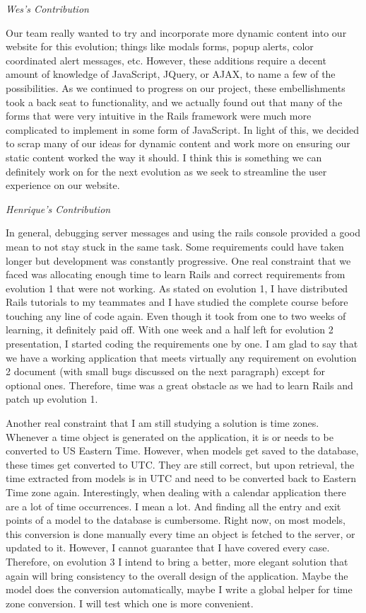 \documentclass[11pt]{article}
\begin{document}
\textit{Wes's Contribution}

Our team really wanted to try and incorporate more dynamic content into our website for this evolution; things like modals forms, popup alerts, color coordinated alert messages, etc.  However, these additions require a decent amount of knowledge of JavaScript, JQuery, or AJAX, to name a few of the possibilities.  As we continued to progress on our project, these embellishments took a back seat to functionality, and we actually found out that many of the forms that were very intuitive in the Rails framework were much more complicated to implement in some form of JavaScript.  In light of this, we decided to scrap many of our ideas for dynamic content and work more on ensuring our static content worked the way it should.  I think this is something we can definitely work on for the next evolution as we seek to streamline the user experience on our website. 

\textit{Henrique's Contribution}

In general, debugging server messages and using the rails console provided a good mean to not stay stuck in the same task. Some requirements could have taken longer but development was constantly progressive. One real constraint that we faced was allocating enough time to learn Rails and correct requirements from evolution 1 that were not working. As stated on evolution 1, I have distributed Rails tutorials to my teammates and I have studied the complete course before touching any line of code again. Even though it took from one to two weeks of learning, it definitely paid off. With one week and a half left for evolution 2 presentation, I started coding the requirements one by one. I am glad to say  that we have a working application that meets virtually any requirement on evolution 2 document (with small bugs discussed on the next paragraph) except for optional ones. Therefore, time was a great obstacle as we had to learn Rails and patch up evolution 1.

Another real constraint that I am still studying a solution is time zones. Whenever a time object is generated on the application, it is or needs to be converted to US Eastern Time. However, when models get saved to the database, these times get converted to UTC. They are still correct, but upon retrieval, the time extracted from models is in UTC and need to be converted back to Eastern Time zone again. Interestingly, when dealing with a calendar application there are a lot of time occurrences. I mean a lot. And finding all the entry and exit points of a model to the database is cumbersome. Right now, on most models, this conversion is done manually every time an object is fetched to the server, or updated to it. However, I cannot guarantee that I have covered every case. Therefore, on evolution 3 I intend to bring a better, more elegant solution that again will bring consistency to the overall design of the application. Maybe the model does the conversion automatically, maybe I write a global helper for time zone conversion. I will test which one is more convenient.
\end{document}

